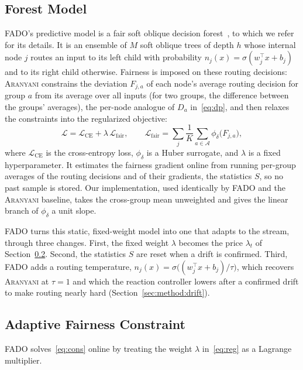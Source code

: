 \documentclass[conference]{IEEEtran}
\newcommand{\fado}{\textsc{FADO}}
\newcommand{\ara}{\textsc{Aranyani}}
\begin{document}
\subsection{Forest Model}
\label{sec:method:model}
\fado{}'s predictive model is a fair soft oblique decision forest~\cite{chowdhury2024enhancing}, to which we refer for its details. It is an ensemble of $M$ soft
oblique trees of depth $h$ whose internal node $j$ routes an input to its left child with probability $n_j(x)=\sigma(w_j^{\top}x+b_j)$ and to its right
child otherwise. Fairness is imposed on these routing decisions: \ara{} constrains the deviation $F_{j,a}$ of each node's average routing decision for group $a$
from its average over all inputs (for two groups, the difference between the groups' averages), the per-node analogue of $D_a$ in~\eqref{eq:dp}, and then
relaxes the constraints into the regularized objective:
\begin{equation}
\mathcal{L}=\mathcal{L}_{\mathrm{CE}}+\lambda\,\mathcal{L}_{\text{fair}},\qquad
\mathcal{L}_{\text{fair}}=\sum_{j}\frac{1}{K}\sum_{a\in\mathcal{A}}\phi_\delta\big(F_{j,a}\big),
\label{eq:reg}
\end{equation}
where $\mathcal{L}_{\mathrm{CE}}$ is the cross-entropy loss, $\phi_\delta$ is a Huber surrogate, and $\lambda$ is a fixed hyperparameter. It estimates the
fairness gradient online from running per-group averages of the routing decisions and of their gradients, the statistics $S$, so no past sample is stored.
Our implementation, used identically by \fado{} and the \ara{} baseline, takes the cross-group mean unweighted and gives the linear branch of $\phi_\delta$ a
unit slope.

\fado{} turns this static, fixed-weight model into one that adapts to the stream, through three changes. First, the fixed weight $\lambda$ becomes the price $\lambda_t$ of Section~\ref{sec:method:lambda}. Second,
the statistics $S$ are reset when a drift is confirmed. Third, \fado{} adds a routing temperature, $n_j(x)=\sigma\big((w_j^{\top}x+b_j)/\tau\big)$, which
recovers \ara{} at $\tau=1$ and which the reaction controller lowers after a confirmed drift to make routing nearly hard
(Section~\ref{sec:method:drift}).

\subsection{Adaptive Fairness Constraint}
\label{sec:method:lambda}
\fado{} solves~\eqref{eq:cons} online by treating the weight $\lambda$ in~\eqref{eq:reg} as a Lagrange multiplier.
\end{document}
